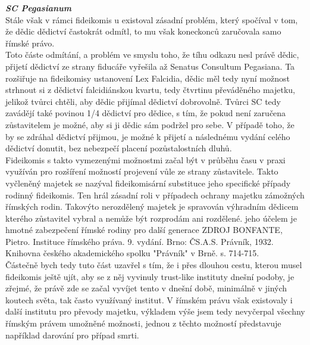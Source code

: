 \documentclass{article}
\begin{document}
\noindent\textbf{\textit{SC Pegasianum}}\\


Stále však v rámci fideikomis u existoval zásadní problém, který spočíval v tom, že dědic dědictví častokrát odmítl, to mu však koneckonců zaručovala samo římské právo.\\ 

Toto částe odmítání, a problém ve smyslu toho, že tíhu odkazu nesl právě dědic, přijetí dědictví ze strany fiducáře vyřešila až Senatus Consultum Pegasiana. Ta rozšiřuje na fideikomisy ustanovení Lex Falcidia, dědic měl tedy nyní možnost strhnout si z dědictví falcidiánskou kvartu, tedy čtvrtinu převáděného majetku, jelikož tvůrci chtěli, aby dědic přijímal dědictví dobrovolně. Tvůrci SC tedy zavádějí také povinou 1/4 dědictví pro dědice, s tím, že pokud není zaručena zůstavitelem je možné, aby si ji dědic sám podržel pro sebe. V případě toho, že by se zdráhal dědictví přijmou, je možné k přijetí a následnému vydání celého dědictví donutit, bez nebezpečí placení pozůstalostních dluhů.\\

Fideikomis s takto vymezenými možnostmi začal být v průběhu času v praxi využíván pro rozšíření možností projevení vůle ze strany zůstavitele. Takto vyčleněný majetek se nazýval fideikomisární substituce jeho specifické případy rodinný fideikomis. Ten hrál zásadní roli v případech ochrany majetku zámožných římských rodin. Takovýto nerozdělený majetek je spravován výhradním dědicem kterého zůstavitel vybral a nemůže být rozprodám ani rozdělené. jeho účelem je hmotné zabezpečení římské rodiny pro další generace ZDROJ BONFANTE, Pietro. Instituce římského práva. 9. vydání. Brno: ČS.A.S. Právník, 1932. Knihovna českého akademického spolku "Právník" v Brně. s. 714-715.\\

Částečně bych tedy tuto část uzavřel s tím, že i přes dlouhou cestu, kterou musel fideikomis ještě ujít, aby se z něj vyvinuly trust-like instituty dnešní podoby, je zřejmé, že právě zde se začal vyvíjet tento v dnešní době, minimálně v jiných koutech světa, tak často využívaný institut. V římském právu však existovaly i další institutu pro převody majetku, výkladem výše jsem tedy nevyčerpal všechny římským právem umožněné možnosti, jednou z těchto možností představuje například darování pro případ smrti.\\
\end{document}
